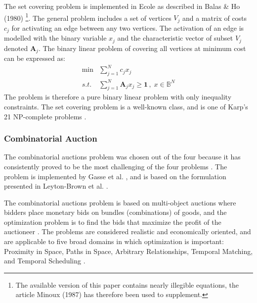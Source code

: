 The set covering problem is implemented in \gls{Ecole} as described in Balas \& Ho (1980)\cite{balas1980set} \footnote{The available version of this paper contains nearly illegible equations, the article Minoux (1987) \cite{minoux1987class} has therefore been used to supplement.}. The general problem includes a set of vertices $V_j$ and a matrix of costs $c_j$ for activating an edge between any two vertices. The activation of an edge is modelled with the binary variable $x_j$ and the characteristic vector of subset $V_j$ denoted $\textbf{A}_j$. The binary linear problem of covering all vertices at minimum cost can be expressed as: 
\begin{align}
    \min &\sum_{j=1}^N c_j x_j \\ s.t. \; &\sum_{j=1}^N \mathbf{A}_j x_j \geq \mathbf{1} \,,\; x \in \mathbb{B}^N 
\end{align}
The problem is therefore a pure binary linear problem with only inequality constraints. The set covering problem is a well-known class, and is one of Karp's 21 \gls{NP}-complete problems \cite{karp1972reducibility}.  

\subsubsection{Combinatorial Auction}

The combinatorial auctions problem was chosen out of the four because it has consistently proved to be the most challenging of the four problems \cite{gasse2019exact} \cite{gupta2020hybrid}. The problem is implemented by Gasse et al. \cite{gasse2019exact}, and is based on the formulation presented in Leyton-Brown et al. \cite{brown2000towards}.  

The combinatorial auctions problem is based on multi-object auctions where bidders place monetary bids on bundles (combinations) of goods, and the optimization problem is to find the bids that maximize the profit of the auctioneer \cite{brown2000towards}. The problems are considered realistic and economically oriented, and are applicable to five broad domains in which optimization is important: Proximity in Space, Paths in Space, Arbitrary Relationships, Temporal Matching, and Temporal Scheduling \cite{brown2000towards}.  




